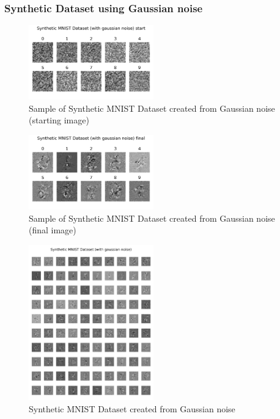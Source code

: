 \documentclass[conference, compsoc]{IEEEtran}
\begin{document}
\subsubsection{Synthetic Dataset using Gaussian noise}
\begin{figure}[H]
	\centering
	\includegraphics[width=0.48\textwidth]{mnist_noise_sample.png}
	\caption{Sample of Synthetic MNIST Dataset created from Gaussian noise (starting image)}
	\label{fig:mnist_noise_sample}
\end{figure}

\begin{figure}[H]
	\centering
	\includegraphics[width=0.48\textwidth]{mnist_noise_syn.png}
	\caption{Sample of Synthetic MNIST Dataset created from Gaussian noise (final image)}
	\label{fig:mnist_noise_syn}
\end{figure}

\begin{figure}[H]
	\centering
	\includegraphics[width=0.48\textwidth]{mnist_noise_syn_all.png}
	\caption{Synthetic MNIST Dataset created from Gaussian noise}
	\label{fig:mnist_noise_syn_all}
\end{figure}
\end{document}
